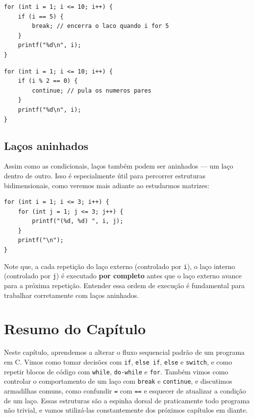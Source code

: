 \documentclass[12pt,a4paper,oneside]{extreport}
\begin{document}
\begin{lstlisting}
for (int i = 1; i <= 10; i++) {
    if (i == 5) {
        break; // encerra o laco quando i for 5
    }
    printf("%d\n", i);
}
\end{lstlisting}

\begin{lstlisting}
for (int i = 1; i <= 10; i++) {
    if (i % 2 == 0) {
        continue; // pula os numeros pares
    }
    printf("%d\n", i);
}
\end{lstlisting}

\subsection{Laços aninhados}

Assim como as condicionais, laços também podem ser aninhados — um laço dentro de outro. Isso é especialmente útil para percorrer estruturas bidimensionais, como veremos mais adiante ao estudarmos matrizes:

\begin{lstlisting}
for (int i = 1; i <= 3; i++) {
    for (int j = 1; j <= 3; j++) {
        printf("(%d, %d) ", i, j);
    }
    printf("\n");
}
\end{lstlisting}

Note que, a cada repetição do laço externo (controlado por \texttt{i}), o laço interno (controlado por \texttt{j}) é executado \textbf{por completo} antes que o laço externo avance para a próxima repetição. Entender essa ordem de execução é fundamental para trabalhar corretamente com laços aninhados.

\section*{Resumo do Capítulo}
Neste capítulo, aprendemos a alterar o fluxo sequencial padrão de um programa em C. Vimos como tomar decisões com \texttt{if}, \texttt{else if}, \texttt{else} e \texttt{switch}, e como repetir blocos de código com \texttt{while}, \texttt{do-while} e \texttt{for}. Também vimos como controlar o comportamento de um laço com \texttt{break} e \texttt{continue}, e discutimos armadilhas comuns, como confundir \texttt{=} com \texttt{==} e esquecer de atualizar a condição de um laço. Essas estruturas são a espinha dorsal de praticamente todo programa não trivial, e vamos utilizá-las constantemente dos próximos capítulos em diante.
\end{document}
